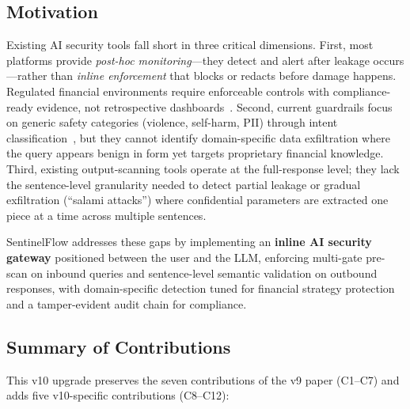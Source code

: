 \documentclass[journal]{IEEEtran}
\begin{document}
\subsection{Motivation}

Existing AI security tools fall short in three critical dimensions. First, most platforms provide \textit{post-hoc monitoring}---they detect and alert after leakage occurs---rather than \textit{inline enforcement} that blocks or redacts before damage happens. Regulated financial environments require enforceable controls with compliance-ready evidence, not retrospective dashboards~\cite{nist_ai_rmf, nist_ai_600_1}. Second, current guardrails focus on generic safety categories (violence, self-harm, PII) through intent classification~\cite{llama_guard, ms_prompt_shields}, but they cannot identify domain-specific data exfiltration where the query appears benign in form yet targets proprietary financial knowledge. Third, existing output-scanning tools operate at the full-response level; they lack the sentence-level granularity needed to detect partial leakage or gradual exfiltration (``salami attacks'') where confidential parameters are extracted one piece at a time across multiple sentences.

SentinelFlow addresses these gaps by implementing an \textbf{inline AI security gateway} positioned between the user and the LLM, enforcing multi-gate pre-scan on inbound queries and sentence-level semantic validation on outbound responses, with domain-specific detection tuned for financial strategy protection and a tamper-evident audit chain for compliance.

\subsection{Summary of Contributions}
This v10 upgrade preserves the seven contributions of the v9 paper (C1--C7) and adds five v10-specific contributions (C8--C12):
\end{document}
